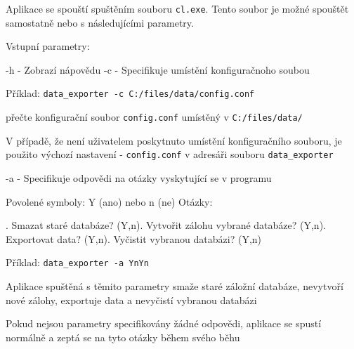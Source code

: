 Aplikace se spouští spuštěním souboru \texttt{cl.exe}. Tento soubor je možné spouštět samostatně nebo s následujícími parametry.

Vstupní parametry:

\setlength{\leftskip}{1cm}

\noindent
-h \hspace{0.5cm} - \hspace{0.5cm} Zobrazí nápovědu\newline
-c \hspace{0.5cm} - \hspace{0.5cm} Specifikuje umístění konfiguračnoho soubou

\hspace{0.5cm}Příklad: \hspace{0.5cm} \texttt{data\_exporter -c C:/files/data/config.conf}

\hspace{0.5cm}přečte konfigurační soubor \texttt{config.conf} umístěný v \texttt{C:/files/data/}

\setlength{\leftskip}{2cm}

V případě, že není uživatelem poskytnuto umístění konfiguračního souboru, je použito výchozí nastavení - \texttt{config.conf} v adresáři souboru \texttt{data\_exporter}

\setlength{\leftskip}{1cm}
\noindent
-a \hspace{0.5cm} - \hspace{0.5cm} Specifikuje odpovědi na otázky vyskytující se v programu

\setlength{\leftskip}{2cm}
\noindent
Povolené symboly: Y (ano) nebo n (ne)
\newline\noindent
Otázky:

\setlength{\leftskip}{3cm}
. Smazat staré databáze? (Y,n). Vytvořit zálohu vybrané databáze? (Y,n). Exportovat data? (Y,n). Vyčistit vybranou databázi? (Y,n)\newline

\setlength{\leftskip}{2cm}
\noindent
Příklad: \hspace{0.5cm} \texttt{data\_exporter -a YnYn}

\noindent    
Aplikace spuštěná s těmito parametry smaže staré záložní databáze, nevytvoří nové zálohy, exportuje data a nevyčistí vybranou databázi           

\noindent
Pokud nejsou parametry specifikovány žádné odpovědi, aplikace se spustí normálně a zeptá se na tyto otázky během svého běhu

